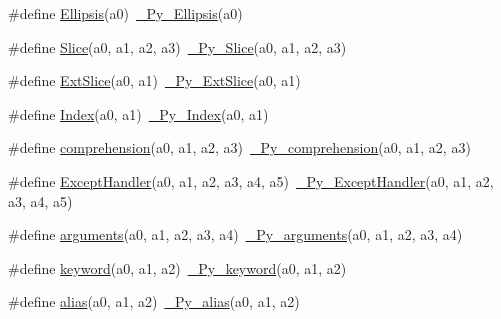 \begin{DoxyCompactItemize}
\item 
\#define \mbox{\hyperlink{_python-ast_8h_aca68c3beeed802b96603f6613db5d786}{Ellipsis}}(a0)~\mbox{\hyperlink{_python-ast_8h_ad6c8822f22b05c0bf9c10f9952f9fd88}{\+\_\+\+Py\+\_\+\+Ellipsis}}(a0)
\item 
\#define \mbox{\hyperlink{_python-ast_8h_a239ffcf8a951a4a683fd09c8355fc888}{Slice}}(a0,  a1,  a2,  a3)~\mbox{\hyperlink{_python-ast_8h_a2319130e186f0697f6d7cc6d6c33b34c}{\+\_\+\+Py\+\_\+\+Slice}}(a0, a1, a2, a3)
\item 
\#define \mbox{\hyperlink{_python-ast_8h_a897a049777d959d56f82a2cd25114f8d}{Ext\+Slice}}(a0,  a1)~\mbox{\hyperlink{_python-ast_8h_a2b4bdfbc6abd001f33a02e5a205fbf1a}{\+\_\+\+Py\+\_\+\+Ext\+Slice}}(a0, a1)
\item 
\#define \mbox{\hyperlink{_python-ast_8h_a2a3071e7f860820007763b32d1b8ef9c}{Index}}(a0,  a1)~\mbox{\hyperlink{_python-ast_8h_a9aac09e16c4da5fdfa59d726fa0e1e2c}{\+\_\+\+Py\+\_\+\+Index}}(a0, a1)
\item 
\#define \mbox{\hyperlink{_python-ast_8h_a7a5e47c28a079b103d1e2fee3c2be08e}{comprehension}}(a0,  a1,  a2,  a3)~\mbox{\hyperlink{_python-ast_8h_a749cdb84b4a563d8059c4b33df52c791}{\+\_\+\+Py\+\_\+comprehension}}(a0, a1, a2, a3)
\item 
\#define \mbox{\hyperlink{_python-ast_8h_af2aadb28141fc0df670e4eb65b8b7dfe}{Except\+Handler}}(a0,  a1,  a2,  a3,  a4,  a5)~\mbox{\hyperlink{_python-ast_8h_a94b7d40f34ae3efcca7c06be95124922}{\+\_\+\+Py\+\_\+\+Except\+Handler}}(a0, a1, a2, a3, a4, a5)
\item 
\#define \mbox{\hyperlink{_python-ast_8h_a35bafe8a298692998789e72a8528d75e}{arguments}}(a0,  a1,  a2,  a3,  a4)~\mbox{\hyperlink{_python-ast_8h_a6c593ed47b25ab1663958b1370d24afc}{\+\_\+\+Py\+\_\+arguments}}(a0, a1, a2, a3, a4)
\item 
\#define \mbox{\hyperlink{_python-ast_8h_a6f4e4451f80663655311eff20aad3ed5}{keyword}}(a0,  a1,  a2)~\mbox{\hyperlink{_python-ast_8h_aa25dc5cb8a1078deaea4ea52c7db9113}{\+\_\+\+Py\+\_\+keyword}}(a0, a1, a2)
\item 
\#define \mbox{\hyperlink{_python-ast_8h_a15c6f038882f857ce45ea016a3a735c9}{alias}}(a0,  a1,  a2)~\mbox{\hyperlink{_python-ast_8h_a2849a333e5d58648fdd6b48c041c5f53}{\+\_\+\+Py\+\_\+alias}}(a0, a1, a2)
\end{DoxyCompactItemize}
